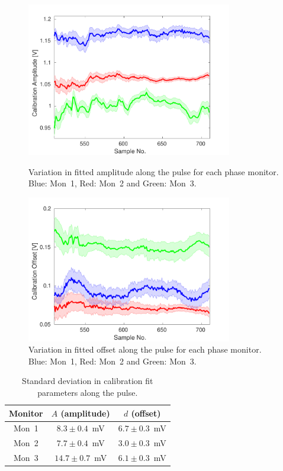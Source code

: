 \begin{figure}
  \centering
  \includegraphics[width=0.8\textwidth]{Figures/phaseMons/calAmpVsSample}
  \caption{Variation in fitted amplitude along the pulse for each phase monitor. Blue: Mon~1, Red: Mon~2 and Green: Mon~3.}
  \label{f:calAmpVsSample}
  \centering
  \includegraphics[width=0.8\textwidth]{Figures/phaseMons/calOffVsSample}
  \caption{Variation in fitted offset along the pulse for each phase monitor. Blue: Mon~1, Red: Mon~2 and Green: Mon~3.}
  \label{f:calOffVsSample}
\end{figure}

\begin{table}
  \begin{center}
    \begin{tabular}{|c c c|}
	   \hline
       Monitor & \(A\) (amplitude) & \(d\) (offset) \\ \hline
       Mon~1 & \(8.3\pm0.4\)~mV & \(6.7\pm0.3\)~mV \\ 
       Mon~2 & \(7.7\pm0.4\)~mV & \(3.0\pm0.3\)~mV\\
       Mon~3 & \(14.7\pm0.7\)~mV & \(6.1\pm0.3\)~mV\\ \hline
    \end{tabular}
    \caption{Standard deviation in calibration fit parameters along the pulse.}
  	\label{t:calConstsStdAlong}
  \end{center}
\end{table}


